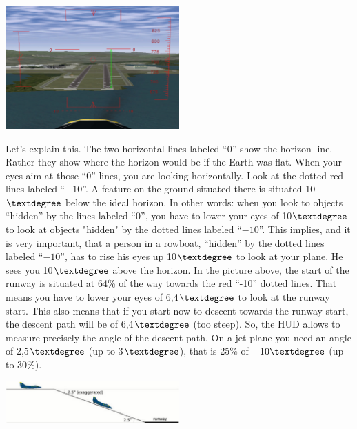 \begin{itemize}
\begin{itemize}
\begin{center}
\includegraphics[width=0.5\textwidth]{img/tut_54}
\end{center}

Let's explain this. The two horizontal lines labeled ``0'' show the
horizon line. Rather they show where the horizon would be if the Earth
was flat. When your eyes aim at those ``0'' lines, you are looking
horizontally. Look at the dotted red lines labeled ``$-10$''. A feature
on the ground situated there is situated 10$\textdegree$ below the
ideal horizon. In other words: when you look to objects ``hidden'' by
the lines labeled ``0'', you have to lower your eyes of 10$\textdegree$
to look at objects "hidden" by the dotted lines labeled ``$-10$''. This
implies, and it is very important, that a person in a rowboat,
``hidden'' by the dotted lines labeled ``$-10$'', has to rise his eyes
up 10$\textdegree$ to look at your plane. He sees you 10$\textdegree$
above the horizon. In the picture above, the start of the runway is
situated at 64\% of the way towards the red ``-10'' dotted lines. That
means you have to lower your eyes of 6,4$\textdegree$ to look at the
runway start. This also means that if you start now to descent towards
the runway start, the descent path will be of 6,4$\textdegree$ (too
steep). So, the  HUD allows to measure
precisely the angle of the descent path. On a jet plane you need an
angle of 2,5$\textdegree$ (up to 3$\textdegree$), that is 25\% of
$-10\textdegree$ (up to 30\%).


\begin{center}
\includegraphics[width=0.5\textwidth]{img/tut_55}
\end{center}


\end{itemize}
\end{itemize}
